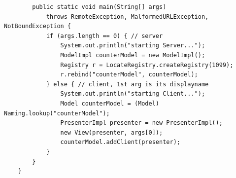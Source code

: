 \begin{verbatim}
        public static void main(String[] args)
            throws RemoteException, MalformedURLException, NotBoundException {
            if (args.length == 0) { // server
                System.out.println("starting Server...");
                ModelImpl counterModel = new ModelImpl();
                Registry r = LocateRegistry.createRegistry(1099);
                r.rebind("counterModel", counterModel);
            } else { // client, 1st arg is its displayname
                System.out.println("starting Client...");
                Model counterModel = (Model) Naming.lookup("counterModel");
                PresenterImpl presenter = new PresenterImpl();
                new View(presenter, args[0]);
                counterModel.addClient(presenter);
            }
        }
    }
\end{verbatim}\\